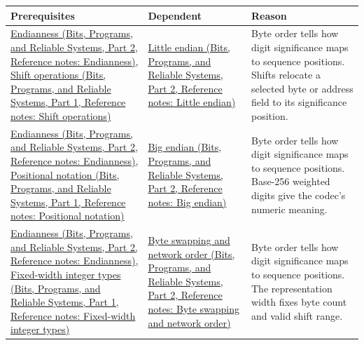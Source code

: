 {\def\LTcaptype{none} %
\begin{longtable}[]{@{}
  >{\raggedright\arraybackslash}p{}
  >{\raggedright\arraybackslash}p{}
  >{\raggedright\arraybackslash}p{}@{}}
\toprule\noalign{}
\begin{minipage}[b]{\linewidth}\raggedright
Prerequisites
\end{minipage} & \begin{minipage}[b]{\linewidth}\raggedright
Dependent
\end{minipage} & \begin{minipage}[b]{\linewidth}\raggedright
Reason
\end{minipage} \\
\midrule\noalign{}
\endhead
\bottomrule\noalign{}
\endlastfoot
\href{../01-Bits-Programs-and-Reliable-Systems-P02/main.pdf\#appendix-bc07c3d25b18}{Endianness (Bits, Programs, and Reliable Systems, Part 2, Reference notes: Endianness)}, \href{../01-Bits-Programs-and-Reliable-Systems-P01/main.pdf\#appendix-73425b25118e}{Shift operations (Bits, Programs, and Reliable Systems, Part 1, Reference notes: Shift operations)} & \href{../01-Bits-Programs-and-Reliable-Systems-P02/main.pdf\#appendix-367b6abf460e}{Little endian (Bits, Programs, and Reliable Systems, Part 2, Reference notes: Little endian)} & Byte order tells how digit significance maps to sequence positions. Shifts relocate a selected byte or address field to its significance position. \\
\href{../01-Bits-Programs-and-Reliable-Systems-P02/main.pdf\#appendix-bc07c3d25b18}{Endianness (Bits, Programs, and Reliable Systems, Part 2, Reference notes: Endianness)}, \href{../01-Bits-Programs-and-Reliable-Systems-P01/main.pdf\#appendix-83c3f28f7bda}{Positional notation (Bits, Programs, and Reliable Systems, Part 1, Reference notes: Positional notation)} & \href{../01-Bits-Programs-and-Reliable-Systems-P02/main.pdf\#appendix-92e040df969a}{Big endian (Bits, Programs, and Reliable Systems, Part 2, Reference notes: Big endian)} & Byte order tells how digit significance maps to sequence positions. Base-256 weighted digits give the codec's numeric meaning. \\
\href{../01-Bits-Programs-and-Reliable-Systems-P02/main.pdf\#appendix-bc07c3d25b18}{Endianness (Bits, Programs, and Reliable Systems, Part 2, Reference notes: Endianness)}, \href{../01-Bits-Programs-and-Reliable-Systems-P01/main.pdf\#appendix-cc04044b5782}{Fixed-width integer types (Bits, Programs, and Reliable Systems, Part 1, Reference notes: Fixed-width integer types)} & \href{../01-Bits-Programs-and-Reliable-Systems-P02/main.pdf\#appendix-11ba36693aa2}{Byte swapping and network order (Bits, Programs, and Reliable Systems, Part 2, Reference notes: Byte swapping and network order)} & Byte order tells how digit significance maps to sequence positions. The representation width fixes byte count and valid shift range. \\

\end{longtable}}
